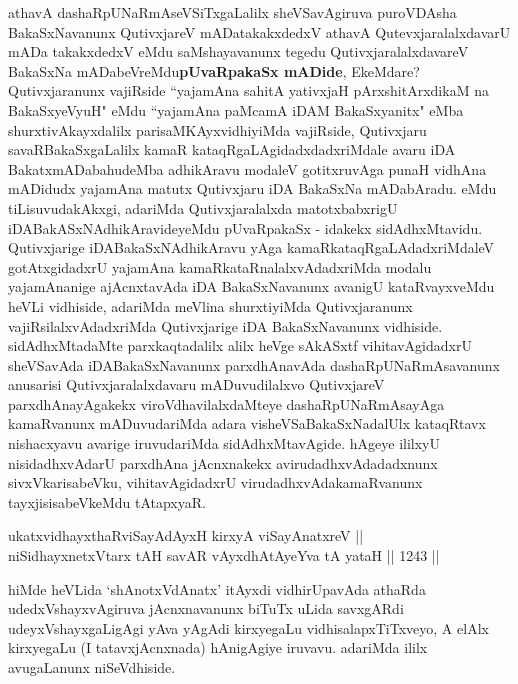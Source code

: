
\begin{artha}
athavA dashaRpUNaRmAseVSiTxgaLalilx sheVSavAgiruva puroVDAsha BakaSxNavanunx QutivxjareV mADatakakxdedxV athavA QutevxjaralalxdavarU mADa takakxdedxV eMdu saMshayavanunx tegedu QutivxjaralalxdavareV BakaSxNa mADabeVreMdu\textbf{pUvaRpakaSx mADide}, EkeMdare? Qutivxjaranunx vajiRside ``yajamAna sahitA yativxjaH pArxshitArxdikaM na BakaSxyeVyuH" eMdu ``yajamAna paMcamA iDAM BakaSxyanitx" eMba shurxtivAkayxdalilx parisaMKAyxvidhiyiMda vajiRside, Qutivxjaru savaRBakaSxgaLalilx kamaR kataqRgaLAgidadxdadxriMdale avaru iDA BakatxmADabahudeMba adhikAravu modaleV gotitxruvAga punaH vidhAna mADidudx yajamAna matutx Qutivxjaru iDA BakaSxNa mADabAradu. eMdu tiLisuvudakAkxgi, adariMda Qutivxjaralalxda matotxbabxrigU iDABakASxNAdhikAravideyeMdu pUvaRpakaSx - idakekx sidAdhxMtavidu. Qutivxjarige iDABakaSxNAdhikAravu yAga kamaRkataqRgaLAdadxriMdaleV gotAtxgidadxrU yajamAna kamaRkataRnalalxvAdadxriMda modalu yajamAnanige ajAcnxtavAda iDA BakaSxNavanunx avanigU kataRvayxveMdu heVLi vidhiside, adariMda meVlina shurxtiyiMda Qutivxjaranunx vajiRsilalxvAdadxriMda Qutivxjarige iDA BakaSxNavanunx vidhiside. sidAdhxMtadaMte parxkaqtadalilx alilx heVge sAkASxtf vihitavAgidadxrU sheVSavAda iDABakaSxNavanunx parxdhAnavAda dashaRpUNaRmAsavanunx anusarisi Qutivxjaralalxdavaru mADuvudilalxvo QutivxjareV parxdhAnayAgakekx viroVdhavilalxdaMteye dashaRpUNaRmAsayAga kamaRvanunx mADuvudariMda adara visheVSaBakaSxNadalUlx kataqRtavx nishacxyavu avarige iruvudariMda sidAdhxMtavAgide. hAgeye ililxyU nisidadhxvAdarU parxdhAna jAcnxnakekx avirudadhxvAdadadxnunx sivxVkarisabeVku, vihitavAgidadxrU virudadhxvAdakamaRvanunx tayxjisisabeVkeMdu tAtapxyaR.
\end{artha}

\begin{shl}
ukatxvidhayxthaRviSayAdAyxH kirxyA viSayAnatxreV || \\
niSidhayxnetxV\s tarx tAH savAR vAyxdhAtAyeYva tA yataH \hfill || 1243 ||  
\end{shl}

\begin{artha}
hiMde heVLida `shAnotxVdAnatx'  itAyxdi vidhirUpavAda athaRda udedxVshayxvAgiruva jAcnxnavanunx biTuTx uLida savxgARdi udeyxVshayxgaLigAgi yAva yAgAdi kirxyegaLu vidhisalapxTiTxveyo, A elAlx kirxyegaLu (I tatavxjAcnxnada) hAnigAgiye iruvavu. adariMda ililx avugaLanunx niSeVdhiside.
\end{artha}

